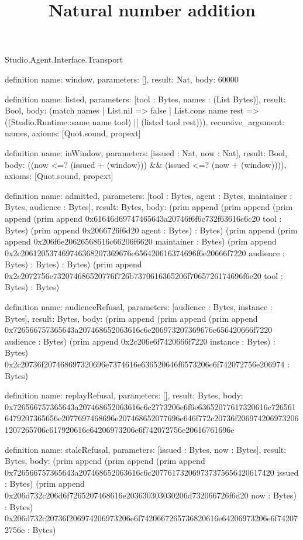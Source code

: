 \begin{lexlean}{Studio.Agent.Interface.Transport}
\title{Natural number addition}
\begin{semanticmodule}
definition{
  name: window,
  parameters: [],
  result: Nat,
  body: 60000
}

definition{
  name: listed,
  parameters: [tool : Bytes, names : (List Bytes)],
  result: Bool,
  body: (match names
    | List.nil => false
    | List.cons name rest => ((Studio.Runtime::same name tool) || (listed tool rest))),
  recursive_argument: names,
  axioms: [Quot.sound, propext]
}

definition{
  name: inWindow,
  parameters: [issued : Nat, now : Nat],
  result: Bool,
  body: ((now <=? (issued + (window))) && (issued <=? (now + (window)))),
  axioms: [Quot.sound, propext]
}

definition{
  name: admitted,
  parameters: [tool : Bytes, agent : Bytes, maintainer : Bytes, audience : Bytes],
  result: Bytes,
  body: (prim append (prim append (prim append (prim append 0x61646d69747465643a20746f6f6c732f63616c6c20 tool : Bytes) (prim append 0x2066726f6d20 agent : Bytes) : Bytes) (prim append (prim append 0x206f6e20626568616c66206f6620 maintainer : Bytes) (prim append 0x2c206120537469746368207369676e656420616374696f6e20666f7220 audience : Bytes) : Bytes) : Bytes) (prim append 0x2c2072756e732074686520776f726b7370616365206f7065726174696f6e20 tool : Bytes) : Bytes)
}

definition{
  name: audienceRefusal,
  parameters: [audience : Bytes, instance : Bytes],
  result: Bytes,
  body: (prim append (prim append (prim append 0x726566757365643a207468652063616c6c206973207369676e656420666f7220 audience : Bytes) (prim append 0x2c206e6f7420666f7220 instance : Bytes) : Bytes) 0x2c20736f207468697320696e7374616e636520646f6573206e6f742072756e206974 : Bytes)
}

definition{
  name: replayRefusal,
  parameters: [],
  result: Bytes,
  body: 0x726566757365643a207468652063616c6c2773206e6f6e63652077617320616c7265616479207365656e2077697468696e207468652077696e646f772c20736f2069742069732061207265706c617920616e64206973206e6f742072756e20616761696e
}

definition{
  name: staleRefusal,
  parameters: [issued : Bytes, now : Bytes],
  result: Bytes,
  body: (prim append (prim append (prim append 0x726566757365643a207468652063616c6c207761732069737375656420617420 issued : Bytes) (prim append 0x206d732c206d6f7265207468616e203630303030206d732066726f6d20 now : Bytes) : Bytes) 0x206d732c20736f206974206973206e6f7420667265736820616e64206973206e6f742072756e : Bytes)
}


\end{semanticmodule}
\end{lexlean}
